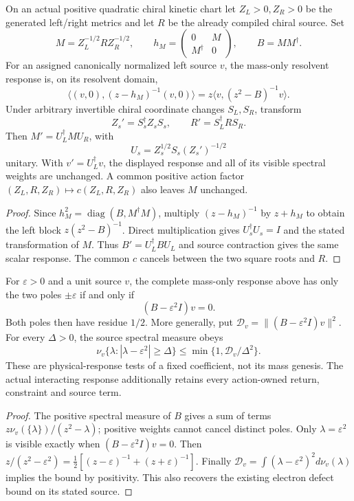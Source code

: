 \documentclass[12pt,a4paper]{article}
\begin{document}
\begin{theorem}
\label{p6:thm:v2210-lit-kinetic-source}
On an actual positive quadratic chiral kinetic chart let
\(Z_L>0,Z_R>0\) be the generated left/right metrics and let \(R\) be the
already compiled chiral source.  Set
\[
 M=Z_L^{-1/2}RZ_R^{-1/2},\qquad
 h_M=\begin{pmatrix}0&M\\M^\dagger&0\end{pmatrix},\qquad B=MM^\dagger.
\]
For an assigned canonically normalized left source \(v\), the mass-only
resolvent response is, on its resolvent domain,
\[
 \boxed{\langle(v,0),(z-h_M)^{-1}(v,0)\rangle
 =z\langle v,(z^2-B)^{-1}v\rangle.}
\]
Under arbitrary invertible chiral coordinate changes \(S_L,S_R\), transform
\[
 Z_s'=S_s^\dagger Z_sS_s,\qquad R'=S_L^\dagger RS_R.
\]
Then \(M'=U_L^\dagger MU_R\), with
\[
 U_s=Z_s^{1/2}S_s(Z_s')^{-1/2}
\]
unitary.  With \(v'=U_L^\dagger v\), the displayed response and all of its
visible spectral weights are unchanged.  A common positive action factor
\((Z_L,R,Z_R)\mapsto c(Z_L,R,Z_R)\) also leaves \(M\) unchanged.
\end{theorem}
\begin{proof}
Since \(h_M^2=\operatorname{diag}(B,M^\dagger M)\), multiply
\((z-h_M)^{-1}\) by \(z+h_M\) to obtain the left block
\(z(z^2-B)^{-1}\).  Direct multiplication gives
\(U_s^\dagger U_s=I\) and the stated transformation of \(M\).
Thus \(B'=U_L^\dagger BU_L\) and source contraction gives the same scalar
response.  The common \(c\) cancels between the two square roots and \(R\).
\end{proof}

\begin{corollary}
\label{p6:cor:v2210-lit-tagged-defect}
For \(\varepsilon>0\) and a unit source \(v\), the complete mass-only
response above has only the two poles \(\pm\varepsilon\) if and only if
\[
 \boxed{(B-\varepsilon^2I)v=0.}
\]
Both poles then have residue \(1/2\).  More generally, put
\(\mathcal D_v=\|(B-\varepsilon^2I)v\|^2\).  For every
\(\Delta>0\), the source spectral measure obeys
\[
 \nu_v\{\lambda:|\lambda-\varepsilon^2|\ge\Delta\}
 \le\min\{1,\mathcal D_v/\Delta^2\}.
\]
These are physical-response tests of a fixed coefficient, not its mass
genesis.  The actual interacting response additionally retains every
action-owned return, constraint and source term.
\end{corollary}
\begin{proof}
The positive spectral measure of \(B\) gives a sum of terms
\(z\nu_v(\{\lambda\})/(z^2-\lambda)\); positive weights cannot cancel
distinct poles.  Only \(\lambda=\varepsilon^2\) is visible exactly when
\((B-\varepsilon^2I)v=0\).  Then
\(z/(z^2-\varepsilon^2)=\tfrac12[(z-\varepsilon)^{-1}
+(z+\varepsilon)^{-1}]\).  Finally
\(\mathcal D_v=\int(\lambda-\varepsilon^2)^2d\nu_v(\lambda)\)
implies the bound by positivity.  This also recovers the existing electron
defect bound on its stated source.
\end{proof}
\end{document}
